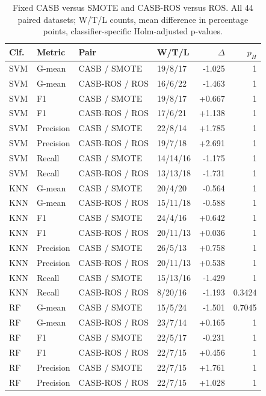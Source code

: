 \documentclass[conference]{IEEEtran}
\begin{document}
\begin{table}[!tp]\centering\renewcommand{\arraystretch}{.94}

\centering\footnotesize
\caption{Fixed CASB versus SMOTE and CASB-ROS versus ROS. All 44 paired datasets; W/T/L counts, mean difference in percentage points, classifier-specific Holm-adjusted p-values.}\label{tab:paired}
\begin{tabular}{llllrr}\toprule
Clf. & Metric & Pair & W/T/L & $\Delta$ & $p_H$ \\
\midrule
SVM & G-mean & CASB / SMOTE & 19/8/17 & -1.025 & 1 \\
SVM & G-mean & CASB-ROS / ROS & 16/6/22 & -1.463 & 1 \\
SVM & F1 & CASB / SMOTE & 19/8/17 & +0.667 & 1 \\
SVM & F1 & CASB-ROS / ROS & 17/6/21 & +1.138 & 1 \\
SVM & Precision & CASB / SMOTE & 22/8/14 & +1.785 & 1 \\
SVM & Precision & CASB-ROS / ROS & 19/7/18 & +2.691 & 1 \\
SVM & Recall & CASB / SMOTE & 14/14/16 & -1.175 & 1 \\
SVM & Recall & CASB-ROS / ROS & 13/13/18 & -1.731 & 1 \\
KNN & G-mean & CASB / SMOTE & 20/4/20 & -0.564 & 1 \\
KNN & G-mean & CASB-ROS / ROS & 15/11/18 & -0.588 & 1 \\
KNN & F1 & CASB / SMOTE & 24/4/16 & +0.642 & 1 \\
KNN & F1 & CASB-ROS / ROS & 20/11/13 & +0.036 & 1 \\
KNN & Precision & CASB / SMOTE & 26/5/13 & +0.758 & 1 \\
KNN & Precision & CASB-ROS / ROS & 20/11/13 & +0.538 & 1 \\
KNN & Recall & CASB / SMOTE & 15/13/16 & -1.429 & 1 \\
KNN & Recall & CASB-ROS / ROS & 8/20/16 & -1.193 & 0.3424 \\
RF & G-mean & CASB / SMOTE & 15/5/24 & -1.501 & 0.7045 \\
RF & G-mean & CASB-ROS / ROS & 23/7/14 & +0.165 & 1 \\
RF & F1 & CASB / SMOTE & 22/5/17 & -0.231 & 1 \\
RF & F1 & CASB-ROS / ROS & 22/7/15 & +0.456 & 1 \\
RF & Precision & CASB / SMOTE & 22/7/15 & +1.761 & 1 \\
RF & Precision & CASB-ROS / ROS & 22/7/15 & +1.028 & 1 \\

\end{tabular}
\end{table}
\end{document}
